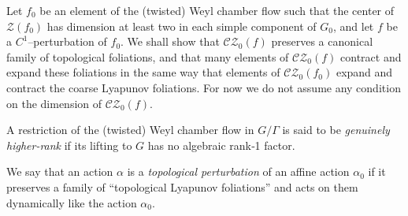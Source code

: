 \documentclass[11pt]{amsart}
\numberwithin{equation}{section}
\newcommand{\CZ}{\mathcal{CZ}}
\theoremstyle{plain}
\begin{document}
Let $f_0$ be an element of the (twisted) Weyl chamber flow such that the center of $\mathcal Z(f_0)$ has dimension at least two in each simple component of $G_0$, and let $f$ be a $C^1$–perturbation of $f_0$. We shall
show that $\CZ_0(f)$ preserves a canonical family of topological
foliations, and that many elements of $\CZ_0(f)$ contract and expand these
foliations in the same way that elements of $\CZ_0(f_0)$ expand and
contract the coarse Lyapunov foliations. For now we do not assume any condition on the dimension of $\CZ_0(f)$.

A restriction of the (twisted) Weyl chamber flow in $G/\Gamma$ is said to
be \emph{genuinely higher-rank} if its lifting to $G$ has no algebraic
rank‑1 factor.

We say that an action $\alpha$ is a \emph{topological perturbation} of an
affine action $\alpha_0$ if it preserves a family of ``topological
Lyapunov foliations'' and acts on them dynamically like the action
$\alpha_0$.
\end{document}
